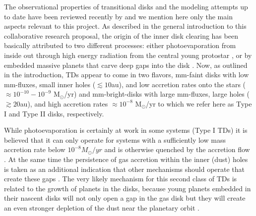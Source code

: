 \documentclass[10pt,fleqn,twoside]{article}
\begin{document}
The observational properties of transitional disks and the modeling attempts up to date
have been reviewed recently by \citet{2016PASA...33....5O} and we mention here only the main aspects 
relevant to this project.
As described in the general introduction to this collaborative research proposal,
the origin of the inner disk clearing has been basically attributed to two different processes:
either photoevaporation from inside out through high energy radiation from the central young protostar
\citep[e.g.][]{1993Icar..106...92S,2006MNRAS.369..216A}, 
or by embedded massive planets that carve deep gaps into the disk \citep[e.g.,][]{2006ApJ...640.1110V}.
Now, as outlined in the introduction, TDs appear to come in two flavors, 
mm-faint disks with low mm-fluxes, small inner holes ($\lesssim 10$au), and low accretion rates
onto the stars ($\approx 10^{-10} - 10^{-9}$ M$_\odot$/yr)
and mm-bright-disks with large mm-fluxes, large holes ($\gtrsim 20$au), and high accretion rates
$\approx 10^{-8}$ M$_\odot$/yr \citep{2012MNRAS.426L..96O} to which we
refer here as  
Type I and Type II disks, respectively.

While photoevaporation is certainly at work in some systems (Type I TDs) it is believed that it can only
operate for systems with a sufficiently low mass accretion rate below $10^{-8} M_\odot/yr$
and is otherwise quenched by the accretion flow \citep{2012MNRAS.426L..96O}.
At the same time the persistence of gas accretion within the inner (dust) holes is taken as an additional
indication that other mechanisms should operate that create these gaps \citep{2014A&A...568A..18M}.
The very likely mechanism for this second class of TDs is related to the growth of planets in the disks,
because young planets embedded in their nascent disks will not only
open a gap in the gas disk but they will create an even stronger
depletion of the dust near the planetary orbit \citep{2004A&A...425L...9P}.
\end{document}
